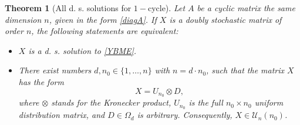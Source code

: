 \documentclass{article}
\newtheorem{theorem}{Theorem}[section]
\theoremstyle{definition}\newtheorem{example}{Example}[section]
\def\U{{\mathcal{U}}}
\begin{document}
	
	\begin{theorem}[All d. s. solutions for $1-$cycle]\label{1cycleallsol} Let $A$ be a cyclic matrix the same dimension $n$, given in the form \eqref{diagA}. If $X$ is a doubly stochastic matrix of order $n$, the following statements are equivalent:
		\begin{itemize}
			\item[(a)] $X$ is a d. s. solution to \eqref{YBME}.
			\item[(b)] There exist numbers $d,n_0\in\{1,\ldots,n\}$ with $n=d\cdot n_0$, such that the matrix $X$ has the form
			\begin{equation}
				\label{Kronecker}
				X=U_{n_0}\otimes D,
			\end{equation}
			where $\otimes$ stands for the Kronecker product, $U_{n_0}$ is the full $n_0\times n_0$ uniform distribution matrix, and $D\in\Omega_d$ is arbitrary. Consequently, $X\in\U_n(n_0)$.
		\end{itemize} 
	\end{theorem}
\end{document}
